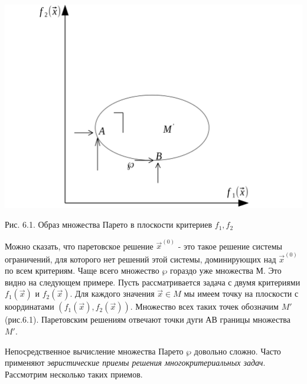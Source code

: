 {
\begin{center}
	\includegraphics[width=1\linewidth]{pictures/picturefile_6_1}

	Рис. 6.1. Образ множества Парето в плоскости критериев $f_{1}, f_{2}$
\end{center}

Можно сказать, что паретовское решение $\vec{x}^{(0)}$ - это такое решение системы ограничений, для которого нет решений этой системы, доминирующих над $\vec{x}^{(0)}$ по всем критериям. Чаще всего множество $\wp $ гораздо уже множества М. Это видно на следующем примере. Пусть рассматривается задача с двумя критериями $f_{1}(\vec{x})$ и $f_{2}(\vec{x})$. Для каждого значения $\vec{x} \in M$ мы имеем точку на плоскости с координатами $(f_{1}(\vec{x}), f_{2}(\vec{x}))$. Множество всех таких точек обозначим ${M}'$ (рис.6.1). Паретовским решениям отвечают точки дуги $АВ$ границы множества  ${M}'$.

Непосредственное вычисление множества Парето $\wp $  довольно сложно. Часто применяют \textit{эвристические приемы решения многокритериальных задач}. Рассмотрим несколько таких приемов.

}
